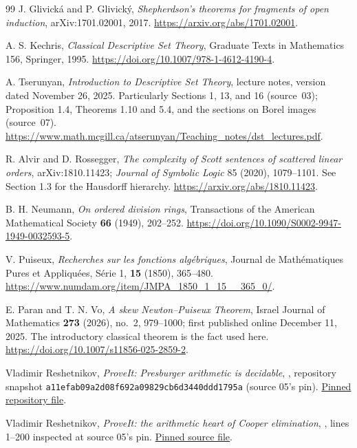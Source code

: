 \documentclass[11pt]{article}
\numberwithin{equation}{section}
\theoremstyle{definition}
\theoremstyle{remark}
\begin{document}
\begin{thebibliography}{99}
J. Glivick\'a and P. Glivick\'y, \emph{Shepherdson's theorems for fragments
of open induction}, arXiv:1701.02001, 2017.
\url{https://arxiv.org/abs/1701.02001}.

A. S. Kechris, \emph{Classical Descriptive Set Theory}, Graduate Texts in
Mathematics 156, Springer, 1995.
\url{https://doi.org/10.1007/978-1-4612-4190-4}.

A. Tserunyan, \emph{Introduction to Descriptive Set Theory}, lecture notes,
version dated November 26, 2025. Particularly Sections 1, 13, and 16
(source~03); Proposition 1.4, Theorems 1.10 and 5.4, and the sections on Borel
images (source~07).
\url{https://www.math.mcgill.ca/atserunyan/Teaching_notes/dst_lectures.pdf}.

R. Alvir and D. Rossegger, \emph{The complexity of Scott sentences of scattered
linear orders}, arXiv:1810.11423; \emph{Journal of Symbolic Logic} 85 (2020),
1079--1101. See Section 1.3 for the Hausdorff hierarchy.
\url{https://arxiv.org/abs/1810.11423}.

B. H. Neumann, \emph{On ordered division rings}, Transactions of the American
Mathematical Society \textbf{66} (1949), 202--252.
\url{https://doi.org/10.1090/S0002-9947-1949-0032593-5}.

V. Puiseux, \emph{Recherches sur les fonctions alg\'ebriques}, Journal de
Math\'ematiques Pures et Appliqu\'ees, S\'erie 1, \textbf{15} (1850), 365--480.
\url{https://www.numdam.org/item/JMPA_1850_1_15__365_0/}.

E. Paran and T. N. Vo, \emph{A skew Newton--Puiseux Theorem}, Israel Journal
of Mathematics \textbf{273} (2026), no.~2, 979--1000; first published online
December 11, 2025. The introductory classical theorem is the fact used here.
\url{https://doi.org/10.1007/s11856-025-2859-2}.

Vladimir Reshetnikov, \emph{ProveIt: Presburger arithmetic is decidable},
, repository snapshot
\texttt{a11efab09a2d08f692a09829cb6d3440ddd1795a} (source 05's pin).
\href{https://github.com/VladimirReshetnikov/ProveIt/blob/a11efab09a2d08f692a09829cb6d3440ddd1795a/Logic/PresburgerArithmetic/README.md}{Pinned repository file}.

Vladimir Reshetnikov, \emph{ProveIt: the arithmetic heart of Cooper
elimination},
,
lines 1--200 inspected at source 05's pin.
\href{https://github.com/VladimirReshetnikov/ProveIt/blob/a11efab09a2d08f692a09829cb6d3440ddd1795a/Logic/PresburgerArithmetic/Lean/PresburgerArithmetic/Cooper.lean}{Pinned source file}.


\end{thebibliography}
\end{document}
